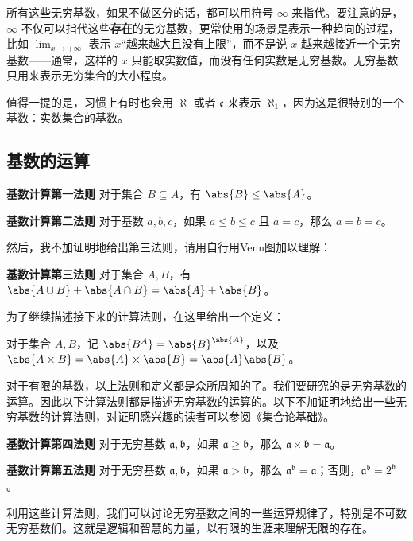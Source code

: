 所有这些无穷基数，如果不做区分的话，都可以用符号 $\infty$ 来指代。要注意的是，$\infty$ 不仅可以指代这些\textbf{存在}的无穷基数，更常使用的场景是表示一种趋向的过程，比如 $\lim_{x\rightarrow +\infty}$ 表示 $x$“越来越大且没有上限”，而不是说 $x$ 越来越接近一个无穷基数——通常，这样的 $x$ 只能取实数值，而没有任何实数是无穷基数。无穷基数只用来表示无穷集合的大小程度。

值得一提的是，习惯上有时也会用 $\aleph$ 或者 $\mathfrak{c}$ 来表示 $\aleph_1$，因为这是很特别的一个基数：实数集合的基数。




\subsection{基数的运算}

\begin{theorem}{}
\textbf{基数计算第一法则} 对于集合 $B\subseteq A$，有 $\abs{B}\leq\abs{A}$。
\end{theorem}

\begin{theorem}{}
\textbf{基数计算第二法则} 对于基数 $a, b, c$，如果 $a\leq b\leq c$ 且 $a=c$，那么 $a=b=c$。
\end{theorem}

然后，我不加证明地给出第三法则，请用自行用Venn图加以理解：

\begin{theorem}{}\label{the_CardiN_1}
\textbf{基数计算第三法则} 对于集合 $A, B$，有 $\abs{A\cup B}+\abs{A\cap B}=\abs{A}+\abs{B}$。
\end{theorem}

为了继续描述接下来的计算法则，在这里给出一个定义：

\begin{definition}{}
对于集合 $A, B$，记 $\abs{B^A}=\abs{B}^{\abs{A}}$，以及 $\abs{A\times B}=\abs{A}\times\abs{B}=\abs{A}\abs{B}$。
\end{definition}

对于有限的基数，以上法则和定义都是众所周知的了。我们要研究的是无穷基数的运算。因此以下计算法则都是描述无穷基数的运算的。以下不加证明地给出一些无穷基数的计算法则，对证明感兴趣的读者可以参阅《集合论基础》\cite{BasicSetTheory}。

\begin{theorem}{}
\textbf{基数计算第四法则} 对于无穷基数 $\mathfrak{a}, \mathfrak{b}$，如果 $\mathfrak{a}\geq\mathfrak{b}$，那么 $\mathfrak{a}\times\mathfrak{b}=\mathfrak{a}$。
\end{theorem}

\begin{theorem}{}
\textbf{基数计算第五法则} 对于无穷基数 $\mathfrak{a}, \mathfrak{b}$，如果 $\mathfrak{a}>\mathfrak{b}$，那么 $\mathfrak{a}^\mathfrak{b}=\mathfrak{a}$；否则，$\mathfrak{a}^\mathfrak{b}=2^\mathfrak{b}$。
\end{theorem}


利用这些计算法则，我们可以讨论无穷基数之间的一些运算规律了，特别是不可数无穷基数们。这就是逻辑和智慧的力量，以有限的生涯来理解无限的存在。








